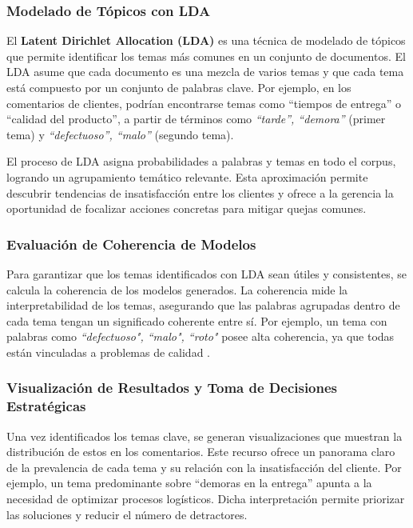 \documentclass{matematicasud}
\begin{document}
\subsubsection{Modelado de Tópicos con LDA}
El \textbf{Latent Dirichlet Allocation (LDA)} es una técnica de modelado de tópicos que permite identificar los temas más comunes en un conjunto de documentos. El LDA asume que cada documento es una mezcla de varios temas y que cada tema está compuesto por un conjunto de palabras clave. Por ejemplo, en los comentarios de clientes, podrían encontrarse temas como ``tiempos de entrega'' o ``calidad del producto'', a partir de términos como \textit{``tarde'', ``demora''} (primer tema) y \textit{``defectuoso'', ``malo''} (segundo tema).\cite{9}

El proceso de LDA asigna probabilidades a palabras y temas en todo el corpus, logrando un agrupamiento temático relevante. Esta aproximación permite descubrir tendencias de insatisfacción entre los clientes y ofrece a la gerencia la oportunidad de focalizar acciones concretas para mitigar quejas comunes.

\subsubsection{Evaluación de Coherencia de Modelos}
Para garantizar que los temas identificados con LDA sean útiles y consistentes, se calcula la coherencia de los modelos generados. La coherencia mide la interpretabilidad de los temas, asegurando que las palabras agrupadas dentro de cada tema tengan un significado coherente entre sí. Por ejemplo, un tema con palabras como \textit{``defectuoso", ``malo", ``roto"} posee alta coherencia, ya que todas están vinculadas a problemas de calidad \cite{10}.

\subsubsection{Visualización de Resultados y Toma de Decisiones Estratégicas}
Una vez identificados los temas clave, se generan visualizaciones que muestran la distribución de estos en los comentarios. Este recurso ofrece un panorama claro de la prevalencia de cada tema y su relación con la insatisfacción del cliente. Por ejemplo, un tema predominante sobre ``demoras en la entrega'' apunta a la necesidad de optimizar procesos logísticos. Dicha interpretación permite priorizar las soluciones y reducir el número de detractores.

\end{document}
